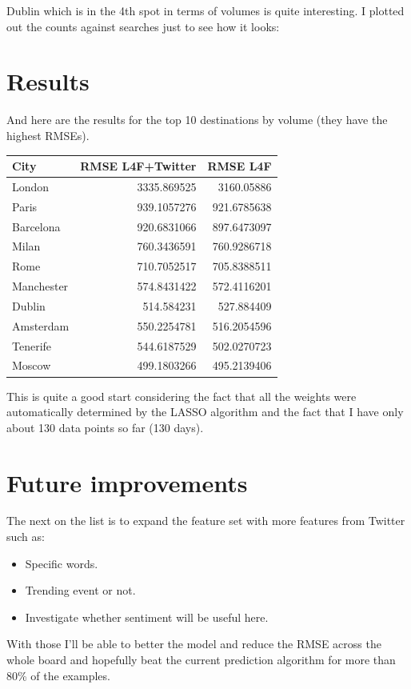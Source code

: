 \documentclass[minf,frontabs,twoside,singlespacing,parskip]{infthesis}
\begin{document}
Dublin which is in the 4th spot in terms of volumes is quite interesting. I plotted out the counts against searches just to see how it looks:
%
%
\section{Results}

And here are the results for the top 10 destinations by volume (they have the highest RMSEs).

\begin{tabular}{ l | r | r }
City	& RMSE L4F+Twitter &RMSE L4F \\
\hline
London & 3335.869525 & 3160.05886 \\
Paris	 & 939.1057276 & 921.6785638  \\
Barcelona & 920.6831066 & 897.6473097  \\
Milan & 760.3436591 & 760.9286718  \\
Rome & 710.7052517 & 705.8388511  \\
Manchester & 574.8431422 & 572.4116201  \\
Dublin & 514.584231	 & 527.884409  \\
Amsterdam & 550.2254781 & 516.2054596  \\
Tenerife & 544.6187529 & 502.0270723  \\
Moscow & 499.1803266 & 495.2139406  \\
\end{tabular}


This is quite a good start considering the fact that all the weights were automatically determined by the LASSO algorithm and the fact that I have only about 130 data points so far (130 days).

\section{Future improvements}

The next on the list is to expand the feature set with more features from Twitter such as:


\begin{itemize}
\item Specific words.
\item Trending event or not.
\item Investigate whether sentiment will be useful here.
\end{itemize}

With those I'll be able to better the model and reduce the RMSE across the whole board and hopefully beat the current prediction algorithm for more than 80\% of the examples.
\end{document}
